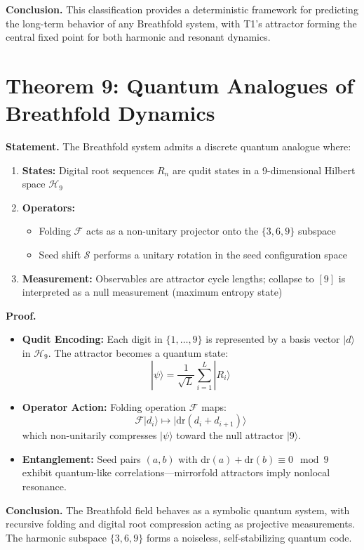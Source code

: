 \documentclass[12pt]{article}
\begin{document}
\textbf{Conclusion.} This classification provides a deterministic framework for predicting the long-term behavior of any Breathfold system, with T1’s attractor forming the central fixed point for both harmonic and resonant dynamics.

\section*{Theorem 9: Quantum Analogues of Breathfold Dynamics}
\textbf{Statement.} The Breathfold system admits a discrete quantum analogue where:
\begin{enumerate}
  \item \textbf{States:} Digital root sequences \( R_n \) are qudit states in a 9-dimensional Hilbert space \( \mathcal{H}_9 \)
  \item \textbf{Operators:}
    \begin{itemize}
      \item Folding \( \mathcal{F} \) acts as a non-unitary projector onto the \(\{3,6,9\}\) subspace
      \item Seed shift \( \mathcal{S} \) performs a unitary rotation in the seed configuration space
    \end{itemize}
  \item \textbf{Measurement:} Observables are attractor cycle lengths; collapse to \([9]\) is interpreted as a null measurement (maximum entropy state)
\end{enumerate}

\textbf{Proof.}
\begin{itemize}
  \item \textbf{Qudit Encoding:} Each digit in \( \{1,\dots,9\} \) is represented by a basis vector \( |d\rangle \) in \( \mathcal{H}_9 \). The attractor becomes a quantum state:
    \[
    |\psi\rangle = \frac{1}{\sqrt{L}} \sum_{i=1}^{L} |R_i\rangle
    \]
  \item \textbf{Operator Action:} Folding operation \( \mathcal{F} \) maps:
    \[
    \mathcal{F}|d_i\rangle \mapsto |\mathrm{dr}(d_i + d_{i+1})\rangle
    \]
    which non-unitarily compresses \( |\psi\rangle \) toward the null attractor \( |9\rangle \).
  \item \textbf{Entanglement:} Seed pairs \((a,b)\) with \( \mathrm{dr}(a) + \mathrm{dr}(b) \equiv 0 \mod 9 \) exhibit quantum-like correlations—mirrorfold attractors imply nonlocal resonance.
\end{itemize}

\textbf{Conclusion.} The Breathfold field behaves as a symbolic quantum system, with recursive folding and digital root compression acting as projective measurements. The harmonic subspace \( \{3,6,9\} \) forms a noiseless, self-stabilizing quantum code.
\end{document}

